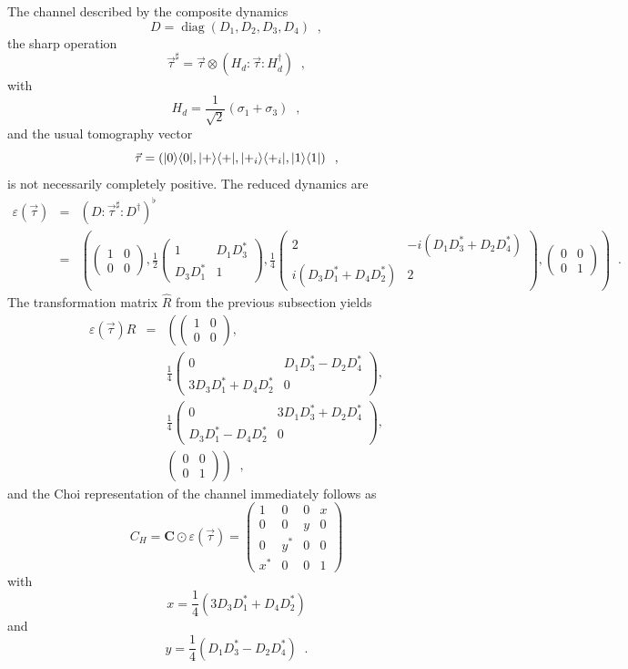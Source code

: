 The channel described by the composite dynamics
$$
D = \operatorname{diag}(D_1,D_2,D_3,D_4)\;\;,
$$
the sharp operation
$$
\vec{\tau}^\sharp = \vec{\tau}\otimes \left( H_d:\vec{\tau}:H_d^\dagger\right)\;\;,
$$
with
$$
H_d = \frac{1}{\sqrt{2}}\left(\sigma_1+\sigma_3\right)\;\;,
$$
and the usual tomography vector
$$
\vec{\tau} = \left(|0\rangle\langle0|,|+\rangle\langle+|,|+_i\rangle\langle+_i|,|1\rangle\langle1|\right)\;\;,
$$
is not necessarily completely positive.  The reduced dynamics are
\begin{eqnarray*}
\varepsilon\left(\vec{\tau}\right)&=&\left(D:\vec{\tau}^\sharp:D^\dagger\right)^\flat \\
&=& \left(\begin{pmatrix} 1&0\\ 0&0 \end{pmatrix} ,
\frac{1}{2}\begin{pmatrix} 1&D_1D_3^*\\ D_3D_1^*&1 \end{pmatrix},
\frac{1}{4}\begin{pmatrix} 2&-i(D_1D_3^*+D_2D_4^*)\\ i(D_3D_1^*+D_4D_2^*)&2 \end{pmatrix},
\begin{pmatrix} 0&0\\ 0&1 \end{pmatrix}\right)\;\;.
\end{eqnarray*}
The transformation matrix $\hat{R}$ from the previous subsection yields
\begin{eqnarray*}
\varepsilon\left(\vec{\tau}\right)\hat{R} &=&  \left(\begin{pmatrix} 1&0\\ 0&0 \end{pmatrix} ,\right.\\
& &\frac{1}{4}\begin{pmatrix} 0&D_1D_3^*-D_2D_4^*\\ 3D_3D_1^*+D_4D_2^*&0 \end{pmatrix},\\
& &\frac{1}{4}\begin{pmatrix} 0&3D_1D_3^*+D_2D_4^*\\ D_3D_1^*-D_4D_2^*&0 \end{pmatrix},\\
& & \left.\begin{pmatrix} 0&0\\ 0&1 \end{pmatrix}\right)\;\;,
\end{eqnarray*}
and the Choi representation of the channel immediately follows as 
$$
C_H =\mathbf{C}\odot\varepsilon(\vec{\tau}) = \begin{pmatrix}
1&0&0&x\\
0&0&y&0\\
0&y^*&0&0\\
x^*&0&0&1
\end{pmatrix}
$$
with
$$
x= \frac{1}{4} \left(3D_3D_1^*+D_4D_2^*\right)
$$
and
$$
y = \frac{1}{4} \left(D_1D_3^*-D_2D_4^*\right)\;\;.
$$

